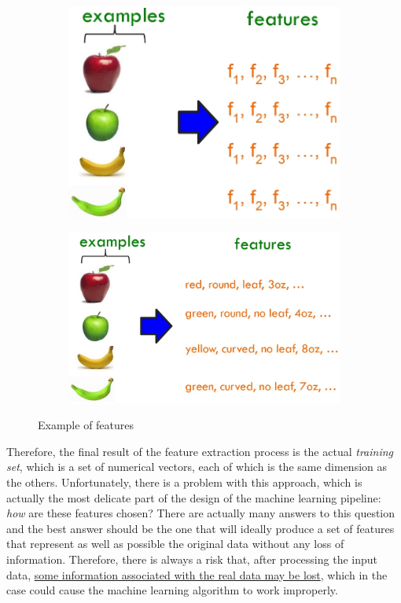 \begin{figure}[h]
      \centering
      \begin{subfigure}{0.40\textwidth}
            \centering
            \includegraphics[width=\textwidth]{../img/Features_1}
      \end{subfigure}
      \hfill
      \begin{subfigure}{0.50\textwidth}
            \centering
            \includegraphics[width=\textwidth]{../img/Features_2}
      \end{subfigure}
      \caption{Example of features}
\end{figure}

\vspace{5mm}

Therefore, the final result of the feature extraction process is the
actual \emph{training set}, which is a set of numerical vectors, each of
which is the same dimension as the others. Unfortunately, there is a
problem with this approach, which is actually the most delicate part of
the design of the machine learning pipeline: \emph{how} are these
features chosen? There are actually many answers to this question and
the best answer should be the one that will ideally produce a set of
features that represent as well as possible the original data without
any loss of information. Therefore, there is always a risk that, after
processing the input data,
\underline{some information associated with the real data may be lost},
which in the case could cause the machine learning algorithm to work
improperly.

